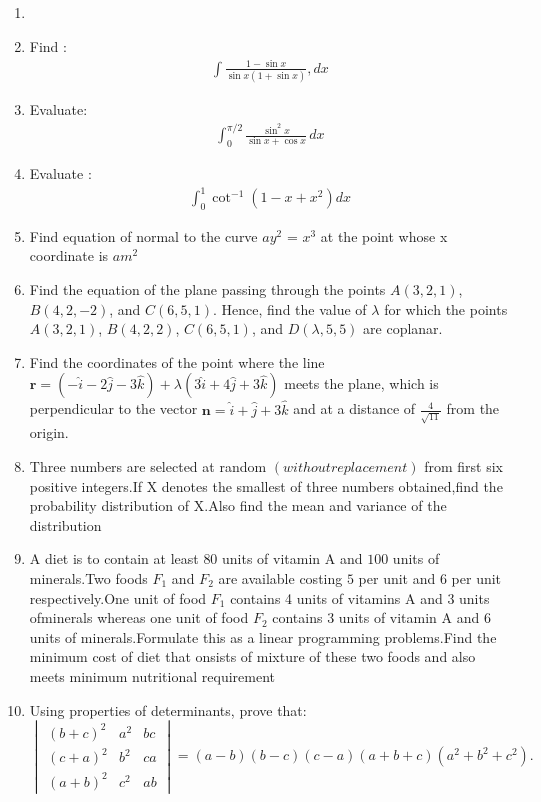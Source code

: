 \documentclass[12pt,-letter paper]{article}
\let\vec\mathbf{}
\let\vec\mathbf{}
\let\vec\mathbf{}
\providecommand{\mydet}[1]{\ensuremath{\begin{vmatrix}#1\end{vmatrix}}}
\providecommand{\brak}[1]{\ensuremath{\left(#1\right)}}
\begin{document}
\begin{enumerate}
\item
	\item Find : \begin{align*}\int\frac{1-\sin{x}}{\sin{x}(1+\sin{x})},dx\end{align*}
\item
	 Evaluate: \begin{align*}\int_{0}^{\pi/2} \frac{\sin^2 x}{\sin{x} + \cos{x}} \, dx\end{align*}
\item
	 Evaluate : \begin{align*}\int_{0}^{1}\cot^{-1}(1-x+x^2)dx\end{align*}
\item
	Find equation of normal to the curve $a$$y^{2}$ = $x^{3}$ at the point whose x coordinate is $am^{2}$
\item
	Find the equation of the plane passing through the points $A\brak{3, 2,1} $, $ B \brak{4, 2, -2} $, and $ C \brak{6, 5, 1} $. Hence, find the value of $\lambda $ for which the points $A\brak{3, 2, 1}$, $B\brak{4,2, 2}$, $ C\brak{6, 5, 1}$, and $D\brak{\lambda, 5, 5}$ are coplanar.
\item
	Find the coordinates of the point where the line $ \vec{r} = (-\hat{i} - 2\hat{j} - 3\hat{k}) + \lambda\brak{3\hat{i} + 4\hat{j} + 3\hat{k}} $ meets the plane, which is perpendicular to the vector $ \vec{n} = \hat{i} + \hat{j} + 3\hat{k} $ and at a distance of $ \frac{4}{\sqrt{11}} $ from the origin.
\item
	   Three numbers are selected at random $\brak{without replacement}$ from first six positive integers.If X denotes the smallest of three numbers obtained,find the probability distribution of X.Also find the mean and variance of the distribution
\item
	A diet is to contain at least $80$ units of vitamin A and $100$ units of minerals.Two foods $F_{1}$ and $F_{2}$ are available costing \rupee $5$ per unit and \rupee $6$ per unit respectively.One unit of food $F_{1}$ contains 4 units of vitamins A and 3 units ofminerals whereas one unit of food $F_{2}$ contains 3 units of vitamin A and 6 units of minerals.Formulate this as a linear programming problems.Find the minimum cost of diet that onsists of mixture of these two foods and also meets minimum nutritional requirement
\item
	Using properties of determinants, prove that: $\mydet{\brak{b+c}^2 & a^2 & bc \\ \brak{c+a}^2 & b^2 & ca \\ \brak{a+b}^2 & c^2 & ab} = \brak{a-b}\brak{b-c}\brak{c-a}\brak{a+b+c}\brak{a^2+b^2+c^2}.$


\end{enumerate}
\end{document}
